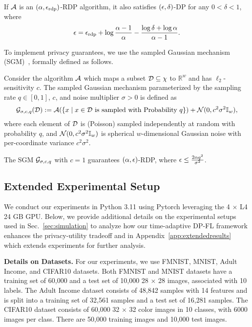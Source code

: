 \begin{lem}\label{app:prior:rdp:lem}
If ${\mathcal{A}}$ is an $({\alpha},{\epsilon}_{\text{rdp}})$-RDP algorithm, it also satisfies $\left({\epsilon}, \delta \right)$-DP for any $0<\delta<1$, where
\begin{align}
    {\epsilon}= {\epsilon}_{\text{rdp}}+\log \frac{{\alpha}-1}{{\alpha}}-\frac{\log \delta + \log {\alpha}}{{\alpha} - 1}.
\end{align}
\end{lem}

{
To implement privacy guarantees, we use the sampled Gaussian mechanism (SGM)~\cite{mironov2019r}, formally defined as follows.
}


{
\begin{definition}
Consider the algorithm ${\mathcal{A}}$ which maps a subset ${{\mathcal{D}}}\subseteq\chi$ to $\mathbb{R}^w$ and has $\ell_2$-sensitivity $c$. The sampled Gaussian mechanism parameterized by the sampling rate $q \in [0,1]$, $c$, and noise multiplier $\sigma>0$ is defined as 
\begin{align}
{\mathcal{G}}_{\sigma, c, q}({{\mathcal{D}}}) := {\mathcal{A}}(\{x \;| \; x\in {{\mathcal{D}}} \text{ is sampled with Probability } q \}) + {\mathcal{N}}(0,c^2\sigma^2{\mathbb{I}}_w),
\end{align}
where each element of ${{\mathcal{D}}}$ is (Poisson) sampled independently at random with probability $q$, and ${\mathcal{N}}(0,c^2\sigma^2{\mathbb{I}}_w)$ is spherical $w$-dimensional Gaussian noise with per-coordinate variance $c^2\sigma^2$.
\end{definition}
}
{
\begin{lem}\label{lem:rdpsGM} 
The SGM ${\mathcal{G}}_{\sigma,c,q}$ with $c=1$ guarantees $(\alpha, {\epsilon})$-RDP, where ${\epsilon}\leq \frac{2\alpha q^2}{\sigma^2}$.
\end{lem}
}



\subsection{Extended Experimental Setup}\label{app:extendedExpSetup}
We conduct our experiments in Python 3.11 using Pytorch leveraging the 4 $\times$ L4 24 GB GPU. 
Below, we provide additional details on the experimental setups used in Sec.~\ref{sec:simulation} to analyze how our time-adaptive DP-FL framework enhances the privacy-utility tradeoff and in Appendix~\ref{app:extendedresults} which extends experiments for further analysis.


\textbf{Details on Datasets.} For our experiments, we use FMNIST, MNIST, Adult Income, and {CIFAR10} datasets. Both FMNIST and MNIST datasets have a training set of 60,000 and a test set of 10,000 28 $\times$ 28 images, associated with 10 labels. The Adult Income dataset consists of 48,842 samples with 14 features and is split into a training set of 32,561 samples and a test set of 16,281 samples. {The CIFAR10 dataset consists of 60,000 32 $\times$ 32 color images in 10 classes, with 6000 images per class. There are 50,000 training images and 10,000 test images. }
 
